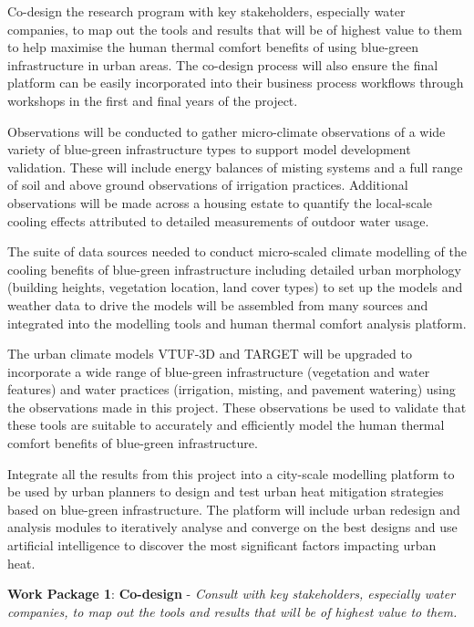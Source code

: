 Co-design the research program with key stakeholders, especially water companies, to map out the tools and results that will be of highest value to them to help maximise the human thermal comfort benefits of using blue-green infrastructure in urban areas. The co-design process will also ensure the final platform can be easily incorporated into their business process workflows through workshops in the first and final years of the project.



Observations will be conducted to gather micro-climate observations of a wide variety of blue-green infrastructure types to support model development validation. These will include energy balances of misting systems and a full range of soil and above ground observations of irrigation practices. Additional observations will be made across a housing estate to quantify the local-scale cooling effects attributed to detailed measurements of outdoor water usage.

The suite of data sources needed to conduct micro-scaled climate modelling of the cooling benefits of blue-green infrastructure including detailed urban morphology (building heights, vegetation location, land cover types) to set up the models and weather data to drive the models will be assembled from many sources and integrated into the modelling tools and human thermal comfort analysis platform.
  
  

  
The urban climate models VTUF-3D and TARGET will be upgraded to incorporate a wide range of blue-green infrastructure (vegetation and water features) and water practices (irrigation, misting, and pavement watering) using the observations made in this project. These observations be used to validate that these tools are suitable to accurately and efficiently model the human thermal comfort benefits of blue-green infrastructure. 


Integrate all the results from this project into a city-scale modelling platform to be used by urban planners to design and test urban heat mitigation strategies based on blue-green infrastructure. The platform will include urban redesign and analysis modules to iteratively analyse and converge on the best designs and use artificial intelligence to discover the most significant factors impacting urban heat.




\textbf{Work Package 1}: \textbf{Co-design} - \emph{Consult with key stakeholders, especially water companies, to map out the tools and results that will be of highest value to them. }

